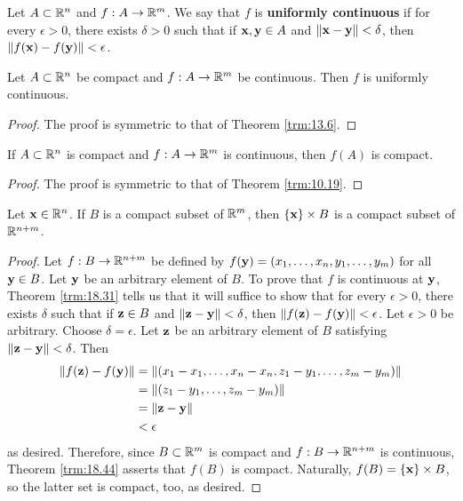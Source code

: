 \documentclass[../main.tex]{subfiles}
\begin{document}
\begin{definition}\label{dfn:18.42}
    Let $A\subset\mathbb{R}^n$ and $f:A\to\mathbb{R}^m$. We say that $f$ is \textbf{uniformly continuous} if for every $\epsilon>0$, there exists $\delta>0$ such that if $\mathbf{x},\mathbf{y}\in A$ and $\norm{\mathbf{x}-\mathbf{y}}<\delta$, then $\norm{f(\mathbf{x})-f(\mathbf{y})}<\epsilon$.
\end{definition}

\begin{theorem}\label{trm:18.43}
    Let $A\subset\mathbb{R}^n$ be compact and $f:A\to\mathbb{R}^m$ be continuous. Then $f$ is uniformly continuous.
    \begin{proof}
        The proof is symmetric to that of Theorem \ref{trm:13.6}.
    \end{proof}
\end{theorem}

\begin{theorem}\label{trm:18.44}
    If $A\subset\mathbb{R}^n$ is compact and $f:A\to\mathbb{R}^m$ is continuous, then $f(A)$ is compact.
    \begin{proof}
        The proof is symmetric to that of Theorem \ref{trm:10.19}.
    \end{proof}
\end{theorem}

\begin{corollary}\label{cly:18.45}
    Let $\mathbf{x}\in\mathbb{R}^n$. If $B$ is a compact subset of $\mathbb{R}^m$, then $\{\mathbf{x}\}\times B$ is a compact subset of $\mathbb{R}^{n+m}$.
    \begin{proof}
        Let $f:B\to\mathbb{R}^{n+m}$ be defined by $f(\mathbf{y})=(x_1,\dots,x_n,y_1,\dots,y_m)$ for all $\mathbf{y}\in B$. Let $\mathbf{y}$ be an arbitrary element of $B$. To prove that $f$ is continuous at $\mathbf{y}$, Theorem \ref{trm:18.31} tells us that it will suffice to show that for every $\epsilon>0$, there exists $\delta$ such that if $\mathbf{z}\in B$ and $\norm{\mathbf{z}-\mathbf{y}}<\delta$, then $\norm{f(\mathbf{z})-f(\mathbf{y})}<\epsilon$. Let $\epsilon>0$ be arbitrary. Choose $\delta=\epsilon$. Let $\mathbf{z}$ be an arbitrary element of $B$ satisfying $\norm{\mathbf{z}-\mathbf{y}}<\delta$. Then
        \begin{align*}
            \norm{f(\mathbf{z})-f(\mathbf{y})} &= \norm{(x_1-x_1,\dots,x_n-x_n,z_1-y_1,\dots,z_m-y_m)}\\
            &= \norm{(z_1-y_1,\dots,z_m-y_m)}\\
            &= \norm{\mathbf{z}-\mathbf{y}}\\
            &< \epsilon
        \end{align*}
        as desired. Therefore, since $B\subset\mathbb{R}^m$ is compact and $f:B\to\mathbb{R}^{n+m}$ is continuous, Theorem \ref{trm:18.44} asserts that $f(B)$ is compact. Naturally, $f(B)=\{\mathbf{x}\}\times B$, so the latter set is compact, too, as desired.
    \end{proof}
\end{corollary}
\end{document}
